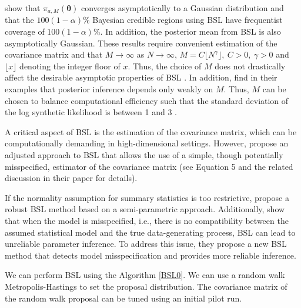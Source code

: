 \cite{nott2023bayesian} show that \( \pi_{a,M}(\boldsymbol{\theta}) \) converges asymptotically to a Gaussian distribution and that the \( 100(1-\alpha)\% \) Bayesian credible regions using BSL have frequentist coverage of \( 100(1-\alpha)\% \). In addition, the posterior mean from BSL is also asymptotically Gaussian. These results require convenient estimation of the covariance matrix and that \( M \to \infty \) as \( N \to \infty \), $M=C\lfloor N^{\gamma} \rfloor, \ C>0, \ \gamma > 0$ and $\lfloor x \rfloor$ denoting the integer floor of $x$. Thus, the choice of \( M \) does not drastically affect the desirable asymptotic properties of BSL \cite{nott2023bayesian}. In addition, \cite{price2018bayesian} find in their examples that posterior inference depends only weakly on \( M \). Thus, \( M \) can be chosen to balance computational efficiency such that the standard deviation of the log synthetic likelihood is between 1 and 3 \cite{an2019accelerating}. 

A critical aspect of BSL is the estimation of the covariance matrix, which can be computationally demanding in high-dimensional settings. However, \cite{nott2023bayesian} propose an adjusted approach to BSL that allows the use of a simple, though potentially misspecified, estimator of the covariance matrix (see Equation 5 and the related discussion in their paper for details).

If the normality assumption for summary statistics is too restrictive, \cite{an2020robust} propose a robust BSL method based on a semi-parametric approach. Additionally, \cite{frazier2021robust} show that when the model is misspecified, i.e., there is no compatibility between the assumed statistical model and the true data-generating process, BSL can lead to unreliable parameter inference. To address this issue, they propose a new BSL method that detects model misspecification and provides more reliable inference.

We can perform BSL using the Algorithm \ref{BSL0}. We can use a random walk Metropolis-Hastings to set the proposal distribution. The covariance matrix of the random walk proposal can be tuned using an initial pilot run.

